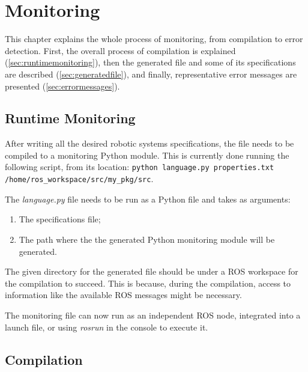 \chapter{Monitoring}
\label{chap:monitoring}

This chapter explains the whole process of monitoring, from compilation to error detection. First, the overall process of compilation is explained (\autoref{sec:runtimemonitoring}), then the generated file and some of its specifications are described (\autoref{sec:generatedfile}), and finally, representative error messages are presented (\autoref{sec:errormessages}).


\section{Runtime Monitoring}
\label{sec:runtimemonitoring}

After writing all the desired robotic systems specifications, the file needs to be compiled to a monitoring Python module. This is currently done running the following script, from its location: \lstinline{python language.py properties.txt /home/ros_workspace/src/my_pkg/src}.

The \textit{language.py} file needs to be run as a Python file and takes as arguments:

\begin{enumerate}
    \item The specifications file;
    \item The path where the the generated Python monitoring module will be generated.
\end{enumerate}

The given directory for the generated file should be under a ROS workspace for the compilation to succeed. This is because, during the compilation, access to information like the available ROS messages might be necessary.

The monitoring file can now run as an independent ROS node, integrated into a launch file, or using \textit{rosrun} in the console to execute it.


\section{Compilation} 
\label{sec:generatedfile}

